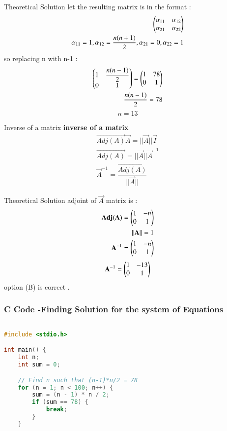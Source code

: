 \documentclass{beamer}
\begin{document}
\begin{frame}{Theoretical Solution}
let the resulting matrix is in the format :
\begin{align*}
    \begin{pmatrix}\alpha_{11}&\alpha_{12}\\\alpha_{21}&\alpha_{22}\end{pmatrix}
    \\
    \alpha_{11}=1,\alpha_{12}=\dfrac{n(n+1)}{2},\alpha_{21}=0,\alpha_{22}=1
\end{align*}
so replacing n with n-1 :
\begin{align*}
    \begin{pmatrix}1&\dfrac{n(n-1)}{2}\\0&1\end{pmatrix}=\begin{pmatrix}1&78\\0&1\end{pmatrix}
    \\
    \dfrac{n(n-1)}{2}=78
    \end{align*}
    \begin{equation*}
        n=13
    \end{equation*}
\end{frame}
\begin{frame}{Inverse of a matrix}
 \textbf{inverse of a matrix}
    \begin{align*}
        \vec{Adj(A)}\vec{A}=||\vec{A}||\vec{I}
        \\
        \vec{Adj(A)}=||\vec{A}||\vec{A}^{-1}
        \\
        \vec{A}^{-1}=\dfrac{\vec{Adj(A)}}{||\vec{A}||}
    \end{align*}
\end{frame}
\begin{frame}{Theoretical Solution}
 adjoint of $\vec{A}$ matrix is :
    \begin{align*}
        \vec{Adj(A)}=\myvec{1&-n\\0&1}
        \\
        ||\Vec{A}||=1
        \\
        \vec{A}^{-1}=\myvec{1&-n\\0&1}
    \end{align*}
    \begin{align*}
        \mathbf{A}^{-1}=\begin{pmatrix}1&-13\\0&1\end{pmatrix}
    \end{align*}
    option (B) is correct .
\end{frame}
\begin{frame}[fragile]
    \frametitle{C Code -Finding Solution for the system of Equations}

    \begin{lstlisting}[language=C]

#include <stdio.h>

int main() {
    int n;
    int sum = 0;

    // Find n such that (n-1)*n/2 = 78
    for (n = 1; n < 100; n++) {
        sum = (n - 1) * n / 2;
        if (sum == 78) {
            break;
        }
    }

    \end{lstlisting}
\end{frame}
\end{document}
